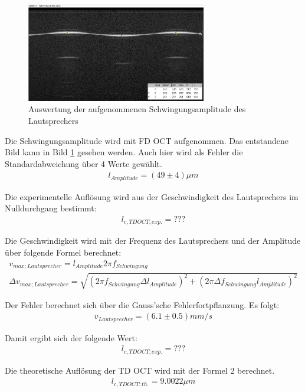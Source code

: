 \documentclass[german, %
parskip=full, %
bibliography=totoc, %
]{scrartcl}
\begin{document}
\begin{figure}[hb] 
  \centering
    \includegraphics[width=0.7\textwidth]{Amplitude_Beispiel}
  \caption{Auswertung der aufgenommenen Schwingungsamplitude des Lautsprechers}
  \label{fig:amplitude}
\end{figure}

Die Schwingungsamplitude wird mit FD OCT aufgenommen. Das entstandene Bild kann in Bild \ref{fig:amplitude} gesehen werden. Auch hier wird als Fehler die Standardabweichung über 4 Werte gewählt.
\begin{align*}
l_{Amplitude} = (49 \pm 4) \mu m
\end{align*}

Die experimentelle Auflösung wird aus der Geschwindigkeit des Lautsprechers im Nulldurchgang bestimmt:
\begin{align}
l_{c, TD OCT; exp.} = ???
\end{align}

Die Geschwindigkeit wird mit der Frequenz des Lautsprechers und der Amplitude über folgende Formel berechnet:
\begin{align}
v_{max; Lautsprecher} = l_{Amplitude} 2 \pi f_{Schwingung} \\
\Delta v_{max; Lautsprecher} = \sqrt{(2 \pi f_{Schwingung} \Delta l_{Amplitude})^2 + (2 \pi \Delta f_{Schwingung} l_{Amplitude})^2}
\end{align}

Der Fehler berechnet sich über die Gauss'sche Fehlerfortpflanzung. Es folgt:
\begin{align*}
v_{Lautsprecher} = (6.1 \pm 0.5) mm/s
\end{align*}
 
Damit ergibt sich der folgende Wert:
\begin{align*}
l_{c, TD OCT; exp.} = ???
\end{align*}

Die theoretische Auflösung der TD OCT wird mit der Formel 2 berechnet. 
\begin{align*}
l_{c, TD OCT; th.} = 9.0022 \mu m
\end{align*}
\end{document}

